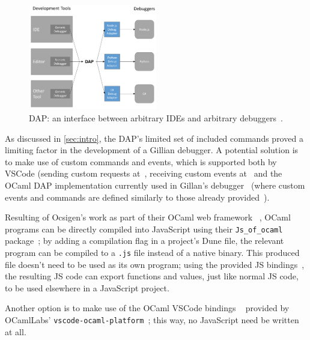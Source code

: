 \begin{figure}[!t]
  \centering
  \includegraphics[width=0.5\textwidth]{img/dap-diagram.png}
  \caption{
    DAP: an interface between arbitrary IDEs and
    arbitrary debuggers~\cite{dap}.
  }
  \label{fig:dap-diagram}
\end{figure}

As discussed in \autoref{sec:intro}, the DAP's limited set of
included commands proved a limiting factor in the development of a Gillian
debugger. A potential solution is to make use of custom commands and events,
which is supported both by VSCode (sending custom requests
at~\cite{vscode-dap-custom-request}, receiving custom events
at~\cite{vscode-dap-custom-event} and the OCaml DAP
implementation currently used in Gillan's debugger~\cite{ocaml-dap} (where
custom events and commands are defined similarly to those already
provided~\cite{ocaml-dap-custom}).


Resulting of Ocsigen's work as part of their OCaml web framework
~\cite{ocsigen-framework}, OCaml programs can be directly compiled into
JavaScript using their \texttt{Js\_of\_ocaml} package~\cite{js-of-ocaml}; by
adding a compilation flag in a project's Dune file, the relevant program can be
compiled to a \texttt{.js} file instead of a native binary. This produced file
doesn't need to be used as its own program; using the provided JS
bindings~\cite{js-of-ocaml-bindings}, the resulting JS code can export
functions and values, just like normal JS code, to be used elsewhere in a
JavaScript project.

Another option is to make use of the OCaml VSCode bindings
~\cite{vscode-ocaml-bindings} provided by OCamlLabs'
\texttt{vscode-ocaml-platform}~\cite{vscode-ocaml-platform, ocamllabs}; this
way, no JavaScript need be written at all.

